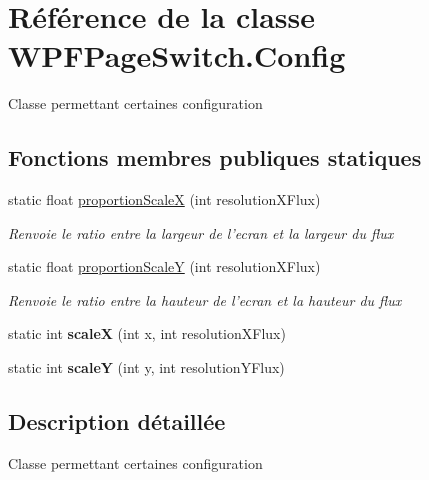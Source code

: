 \hypertarget{class_w_p_f_page_switch_1_1_config}{\section{Référence de la classe W\+P\+F\+Page\+Switch.\+Config}
\label{class_w_p_f_page_switch_1_1_config}
}


Classe permettant certaines configuration  


\subsection*{Fonctions membres publiques statiques}
\begin{DoxyCompactItemize}
\item 
static float \hyperlink{class_w_p_f_page_switch_1_1_config_adee1e4d84a7e18c964540e35a71b3420}{proportion\+Scale\+X} (int resolution\+X\+Flux)
\begin{DoxyCompactList}\small\item\em Renvoie le ratio entre la largeur de l'ecran et la largeur du flux \end{DoxyCompactList}\item 
static float \hyperlink{class_w_p_f_page_switch_1_1_config_a8044a6f5fd6f6b736115222199109ea6}{proportion\+Scale\+Y} (int resolution\+X\+Flux)
\begin{DoxyCompactList}\small\item\em Renvoie le ratio entre la hauteur de l'ecran et la hauteur du flux \end{DoxyCompactList}\item 
\hypertarget{class_w_p_f_page_switch_1_1_config_a64429fd5490e01f9d57544941ae92ec1}{static int {\bfseries scale\+X} (int x, int resolution\+X\+Flux)}\label{class_w_p_f_page_switch_1_1_config_a64429fd5490e01f9d57544941ae92ec1}

\item 
\hypertarget{class_w_p_f_page_switch_1_1_config_a5a63edb13abbed2b365f5fd3a9352157}{static int {\bfseries scale\+Y} (int y, int resolution\+Y\+Flux)}\label{class_w_p_f_page_switch_1_1_config_a5a63edb13abbed2b365f5fd3a9352157}

\end{DoxyCompactItemize}


\subsection{Description détaillée}
Classe permettant certaines configuration 



